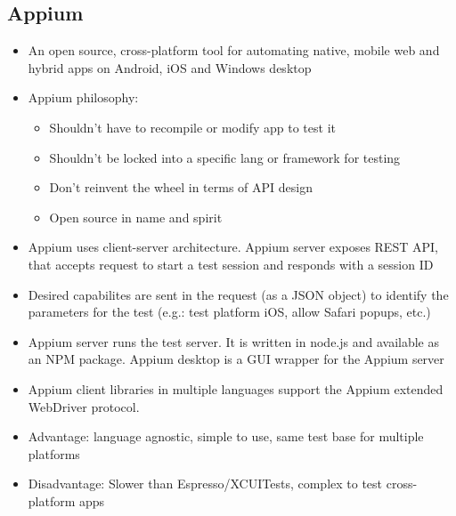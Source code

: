 \documentclass{article}
\begin{document}
\subsection{Appium}
\begin{itemize}
    \item An open source, cross-platform tool for automating native, mobile web and hybrid apps on Android, iOS and Windows desktop
    
    \item Appium philosophy:
    \begin{itemize}
        \item Shouldn't have to recompile or modify app to test it
        
        \item Shouldn't be locked into a specific lang or framework for testing
        
        \item Don't reinvent the wheel in terms of API design
        
        \item Open source in name and spirit
    \end{itemize}
    
    \item Appium uses client-server architecture. Appium server exposes REST API, that accepts request to start a test session and responds with a session ID
    
    \item Desired capabilites are sent in the request (as a JSON object) to identify the parameters for the test (e.g.: test platform iOS, allow Safari popups, etc.)
    
    \item Appium server runs the test server. It is written in node.js and available as an NPM package. Appium desktop is a GUI wrapper for the Appium server
    
    \item Appium client libraries in multiple languages support the Appium extended WebDriver protocol. 
    
    \item Advantage: language agnostic, simple to use, same test base for multiple platforms
    
    \item Disadvantage: Slower than Espresso/XCUITests, complex to test cross-platform apps
\end{itemize}
\end{document}
